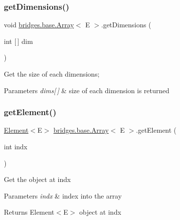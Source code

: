 \subsubsection{\texorpdfstring{get\+Dimensions()}{getDimensions()}}
{\footnotesize\ttfamily void \mbox{\hyperlink{classbridges_1_1base_1_1_array}{bridges.\+base.\+Array}}$<$ E $>$.get\+Dimensions (\begin{DoxyParamCaption}\item[{int \mbox{[}$\,$\mbox{]}}]{dim }\end{DoxyParamCaption})}

Get the size of each dimensions;


\begin{DoxyParams}{Parameters}
{\em dims\mbox{[}$\,$\mbox{]}} & size of each dimension is returned \\
\hline
\end{DoxyParams}
\mbox{\label{classbridges_1_1base_1_1_array_a0e690cbe2606e44cce99b56802b63e0e}} 
\subsubsection{\texorpdfstring{get\+Element()}{getElement()}\hspace{0.1cm}{\footnotesize\ttfamily [1/3]}}
{\footnotesize\ttfamily \mbox{\hyperlink{classbridges_1_1base_1_1_element}{Element}}$<$E$>$ \mbox{\hyperlink{classbridges_1_1base_1_1_array}{bridges.\+base.\+Array}}$<$ E $>$.get\+Element (\begin{DoxyParamCaption}\item[{int}]{indx }\end{DoxyParamCaption})}

Get the object at \textquotesingle{}indx\textquotesingle{}


\begin{DoxyParams}{Parameters}
{\em indx} & index into the array \\
\hline
\end{DoxyParams}
\begin{DoxyReturn}{Returns}
Element$<$\+E$>$ object at \textquotesingle{}indx\textquotesingle{} 
\end{DoxyReturn}
\mbox{\label{classbridges_1_1base_1_1_array_a9eff153c6b63572c18af6194c66ca34c}} 
